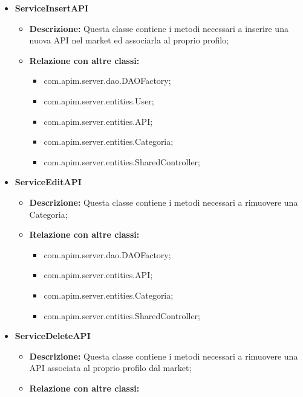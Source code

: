 {{{{\begin{itemize}
\begin{itemize}
\begin{itemize}
            \end{itemize}
          \end{itemize}
          \item \textbf{ServiceInsertAPI}
          \begin{itemize}
            \item \textbf{Descrizione:} Questa classe contiene i metodi necessari a inserire una nuova API nel market ed associarla al proprio profilo;
            \item \textbf{Relazione con altre classi:}
            \begin{itemize}
              \item com.apim.server.dao.DAOFactory;
              \item com.apim.server.entities.User;
              \item com.apim.server.entities.API;
              \item com.apim.server.entities.Categoria;
              \item com.apim.server.entities.SharedController;
            \end{itemize}
          \end{itemize}
          \item \textbf{ServiceEditAPI}
          \begin{itemize}
            \item \textbf{Descrizione:} Questa classe contiene i metodi necessari a rimuovere una Categoria;
            \item \textbf{Relazione con altre classi:}
            \begin{itemize}
              \item com.apim.server.dao.DAOFactory;
              \item com.apim.server.entities.API;
              \item com.apim.server.entities.Categoria;
              \item com.apim.server.entities.SharedController;
            \end{itemize}
          \end{itemize}
           \item \textbf{ServiceDeleteAPI}
          \begin{itemize}
            \item \textbf{Descrizione:} Questa classe contiene i metodi necessari a rimuovere una API associata al proprio profilo dal market;
            \item \textbf{Relazione con altre classi:}

\end{itemize}
\end{itemize}}}}}
